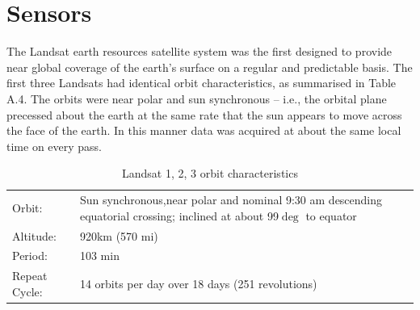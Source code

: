 \documentclass[document.tex]{subfiles}
\begin{document}
\section{Sensors}
The Landsat earth resources satellite system was the first designed to provide near
global coverage of the earth’s surface on a regular and predictable basis.
The first three Landsats had identical orbit characteristics, as summarised in
Table A.4. The orbits were near polar and sun synchronous – i.e., the orbital plane
precessed about the earth at the same rate that the sun appears to move across the
face of the earth. In this manner data was acquired at about the same local time on
every pass.
\begin{table}[H]
	\caption{Landsat 1, 2, 3 orbit characteristics}
	\begin{center}
		\begin{tabularx}{\columnwidth}{|XX|}
			\hline Orbit: & Sun synchronous,near polar and nominal 9:30 am descending equatorial crossing; inclined at about 99$\deg$ to equator\\
			Altitude: & 920km (570 mi)\\
			Period: & 103 min\\
			Repeat Cycle: & 14 orbits per day over 18 days (251 revolutions)\\\hline
		\end{tabularx}
	\end{center}
	\label{tab:Landsat 1, 2, 3 orbit characteristics}
\end{table}
\end{document}
